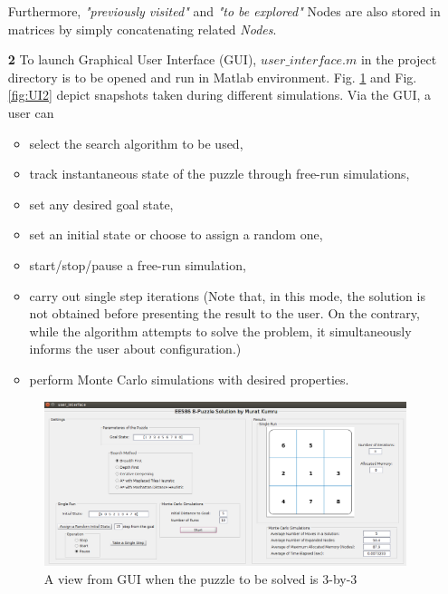 \documentclass[12pt]{article}
\begin{document}
\begin{enumerate}
	Furthermore, \textit{"previously visited"} and  \textit{"to be explored"} Nodes are also stored in matrices by simply concatenating related \textit{Nodes}.
	
	
	\item [\textbf{2}] To launch Graphical User Interface (GUI),  $user\_interface.m$ in the project directory is to be opened and run in Matlab environment. 
	Fig. \ref{fig:UI1} and Fig. \ref{fig:UI2} depict snapshots taken during different simulations.
	Via the GUI, a user can
		\begin{itemize}
			\item select the search algorithm to be used,
			\item track instantaneous state of the puzzle through free-run simulations,
			\item set any desired goal state,
			\item set an initial state or choose to assign a random one,
			\item start/stop/pause a free-run simulation,
			\item carry out single step iterations (Note that, in this mode, the solution is not obtained before presenting the result to the user. On the contrary, while the algorithm attempts to solve the problem, it simultaneously informs the user about configuration.)
			\item perform Monte Carlo simulations with desired properties.
		\end{itemize}

	\begin{figure}[!htb]
		\centering
		\includegraphics[width=1\textwidth]{images/UI_snapshot1.png}
		\caption{A view from GUI when the puzzle to be solved is 3-by-3}
		\centering
		\label{fig:UI1}
	\end{figure}


\end{enumerate}
\end{document}
